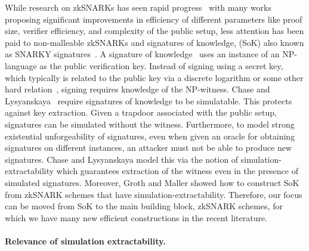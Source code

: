 While research on zkSNARKs has seen rapid progress~\cite{EC:GGPR13,IKO07,AC:Groth10a,TCC:Lipmaa12,TCC:BCIOP13,SP:PHGR13,C:BCGTV13,AC:Lipmaa13,USENIX:BCTV14,EC:Groth16} with many works proposing significant improvements in efficiency of different parameters like proof size, verifier efficiency, and complexity of the public setup, less attention has been paid to non-malleable zkSNARKs and signatures of knowledge, (SoK) also known as SNARKY signatures~\cite{C:GroMal17,EPRINT:BKSV20}. A signature of knowledge~\cite{C:CamSta97,C:ChaLys06} uses an instance of an NP-language as the public verification key. Instead of signing using a secret key, which typically is related to the public key via a discrete logarithm or some other hard relation~\cite{AC:DHLW10}, signing requires knowledge of the NP-witness. Chase and Lysyanskaya~\cite{C:ChaLys06} require signatures of knowledge to be simulatable. This protects against key extraction. Given a trapdoor associated with the public setup, signatures can be simulated without the witness. Furthermore, to model strong existential unforgeability of signatures, even when given an oracle for obtaining signatures on different instances, an attacker must not be able to produce new signatures. Chase and Lysyanskaya model this via the notion of simulation-extractability which guarantees extraction of the witness even in the presence of simulated signatures.
Moreover,  Groth and Maller \cite{C:GroMal17} showed how to construct 
SoK from zkSNARK schemes that have simulation-extractability. 
Therefore, our focus can be moved from SoK to the main building block,  zkSNARK schemes,  for which we have many new efficient constructions in the recent literature. 
 

\paragraph{Relevance of simulation extractability.}

